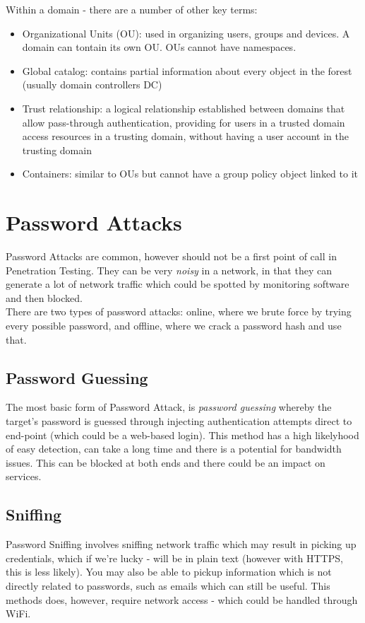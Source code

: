 Within a domain - there are a number of other key terms:
\begin{itemize}
    \item Organizational Units (OU): used in organizing users, groups and devices. A domain can tontain its own OU. OUs cannot have namespaces.
    \item Global catalog: contains partial information about every object in the forest (usually domain controllers DC)
    \item Trust relationship: a logical relationship established between domains that allow pass-through authentication, providing for users in a trusted domain access resources in a trusting domain, without having a user account in the trusting domain
    \item Containers: similar to OUs but cannot have a group policy object linked to it
\end{itemize}


\section{Password Attacks}
Password Attacks are common, however should not be a first point of call in Penetration Testing. They can be very \textit{noisy} in a network, in that they can generate a lot of network traffic which could be spotted by monitoring software and then blocked.\\

There are two types of password attacks: online, where we brute force by trying every possible password, and offline, where we crack a password hash and use that. 

\subsection{Password Guessing}
The most basic form of Password Attack, is \textit{password guessing} whereby the target's password is guessed through injecting authentication attempts direct to end-point (which could be a web-based login). This method has a high likelyhood of easy detection, can take a long time and there is a potential for bandwidth issues. This can be blocked at both ends and there could be an impact on services.

\subsection{Sniffing}
Password Sniffing involves sniffing network traffic which may result in picking up credentials, which if we're lucky - will be in plain text (however with HTTPS, this is less likely). You may also be able to pickup information which is not directly related to passwords, such as emails which can still be useful. This methods does, however, require network access - which could be handled through WiFi.

